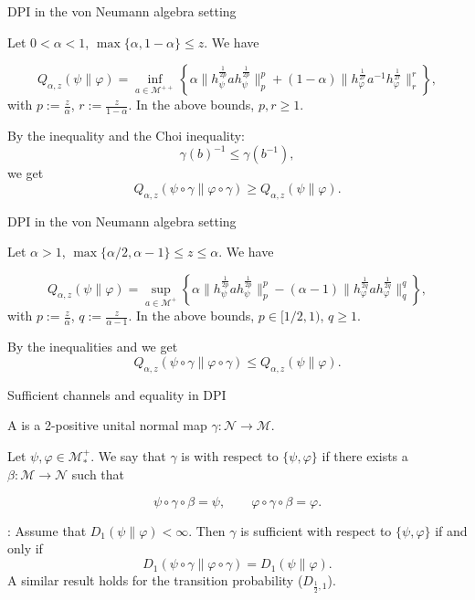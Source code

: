 \documentclass[mathserif]{beamer}
\newcommand{\<}{\langle}
\renewcommand{\>}{\rangle}
\newcommand{\Me}{\mathcal M}
\newcommand{\Ne}{\mathcal N}
\newcommand{\myfootnote}[1]{
    \renewcommand{\thefootnote}{}
    \footnotetext{\hspace{-16.5pt}\scriptsize#1}
    \renewcommand{\thefootnote}{\arabic{footnote}}
}
\begin{document}
\begin{frame}{DPI in the von Neumann algebra setting}

Let $0<\alpha<1$, $\max\{\alpha,1-\alpha\}\le z$.  We have

\medskip 

\[
Q_{\alpha,z}(\psi\|\varphi)=\inf_{a\in \Me^{++}}\left\{\alpha
\Big\|h_\psi^{\frac{1}{2p}}ah_\psi^{\frac{1}{2p}}\Big\|_p^{p}
+(1-\alpha) \Big\|h_\varphi^{\frac{1}{2r}}a^{-1}h_\varphi^{\frac{1}{2r}}\Big\|_r^{r}
\right\},
\]
with $p:=\frac{z}{\alpha}$, $r:=\frac{z}{1-\alpha}$. In the above bounds, $p,r\ge 1$.

\bigskip

By the inequality  and the Choi inequality:
\[
\gamma(b)^{-1}\le \gamma(b^{-1}),
\]
we get
\[
Q_{\alpha,z}(\psi\circ\gamma\|\varphi\circ\gamma)\ge Q_{\alpha,z}(\psi\|\varphi).
\]


\end{frame}



\begin{frame}{DPI in the von Neumann algebra setting}

Let $\alpha>1$, $\max\{\alpha/2,\alpha-1\}\le z\le \alpha$.  We have

\medskip 

\[
Q_{\alpha,z}(\psi\|\varphi)=\sup_{a\in \Me^{+}}\left\{\alpha
\Big\|h_\psi^{\frac{1}{2p}}ah_\psi^{\frac{1}{2p}}\Big\|_p^{p}
-(\alpha-1) \Big\|h_\varphi^{\frac{1}{2q}}ah_\varphi^{\frac{1}{2q}}\Big\|_q^{q}
\right\},
\]
with $p:=\frac{z}{\alpha}$, $q:=\frac{z}{\alpha-1}$. In the above bounds, $p\in [1/2,1)$,
$q\ge 1$.

\bigskip

By the inequalities  and  
we get
\[
Q_{\alpha,z}(\psi\circ\gamma\|\varphi\circ\gamma)\le Q_{\alpha,z}(\psi\|\varphi).
\]

\end{frame}

\begin{frame}{Sufficient channels and equality in DPI}

A  is a 2-positive unital normal map $\gamma:\Ne\to \Me$.

\bigskip

Let $\psi,\varphi\in \Me_*^+$. We say that $\gamma$ is  with respect to
$\{\psi,\varphi\}$ if there exists a  $\beta:\Me\to \Ne$ such that\myfootnote{Petz, 1986, 1988}
\[
\psi\circ \gamma\circ \beta=\psi,\qquad \varphi\circ \gamma\circ \beta=\varphi.
\]

\bigskip

: Assume that $D_1(\psi\|\varphi)<\infty$. Then $\gamma$ is
sufficient with respect to $\{\psi,\varphi\}$ if and only if
\[
D_1(\psi\circ\gamma\|\varphi\circ\gamma)=D_1(\psi\|\varphi).
\]
A similar result holds for the transition probability ($D_{\frac12,1}$).






\end{frame}
\end{document}

